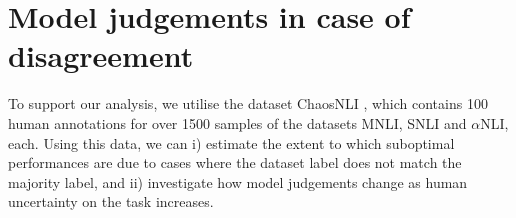 
\section{Model judgements in case of disagreement}

% 
% 

To support our analysis, we utilise the dataset ChaosNLI \citet{nie-etal-2020-learn}, which contains 100 human annotations for over 1500 samples of the datasets MNLI, SNLI and $\alpha$NLI, each.
Using this data, we can i) estimate the extent to which suboptimal performances are due to cases where the dataset label does not match the majority label, and ii) investigate how model judgements change as human uncertainty on the task increases.

